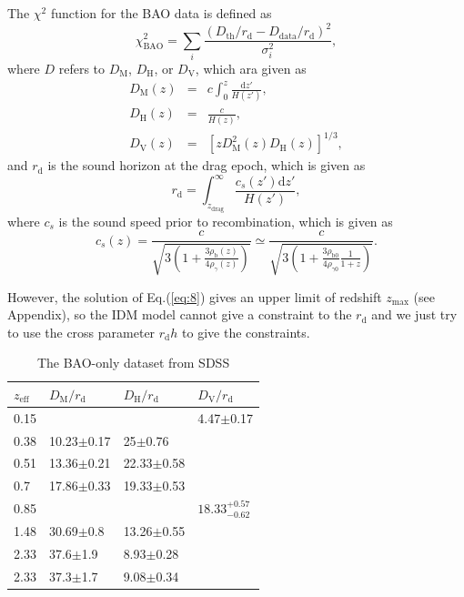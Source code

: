 \documentclass[twocolumn]{aastex631}
\begin{document}
   The $\chi^2$ function for the BAO data is defined as
   \begin{equation}
      \chi_{\text{BAO}}^2=\sum_i\frac{(D_{\text{th}}/r_{\text{d}}-D_{\text{data}}/r_{\text{d}})^2}{\sigma_i^2},
   \end{equation}
   where $D$ refers to $D_{\text{M}}$, $D_{\text{H}}$, or $D_{\text{V}}$, which ara given as
   \begin{eqnarray}
      D_{\text{M}}(z)&=&c\int_0^z\frac{\text{d}z'}{H(z')},\\
      D_{\text{H}}(z)&=&\frac{c}{H(z)},\\
      D_{\text{V}}(z)&=&\left[zD_{\text{M}}^2(z)D_{\text{H}}(z)\right]^{1/3},
   \end{eqnarray}
   and $r_{\text{d}}$ is the sound horizon at the drag epoch, which is given as
   \begin{equation}
      r_{\text{d}}=\int_{z_{\text{drag}}}^{\infty}\frac{c_s(z')\text{d}z'}{H(z')},
   \end{equation}
   where $c_s$ is the sound speed prior to recombination, which is given as
   \begin{equation}
      c_s(z)=\frac{c}{\sqrt{3\left(1+\frac{3\rho_{\mathrm{b}}(z)}{4\rho_{\gamma}(z)}\right)}}\simeq
      \frac{c}{\sqrt{3\left(1+\frac{3\rho_{\mathrm{b}0}}{4\rho_{\gamma0}}\frac{1}{1+z}\right)}}.
   \end{equation}

   However, the solution of Eq.(\ref{eq:8}) gives an upper limit of redshift $z_{\max}$
   (see Appendix), so the IDM model cannot give a constraint to the $r_{\text{d}}$ and we just try to use the cross
   parameter $r_{\text{d}}h$ to give the constraints.

   \begin{table}[htbp]
      \caption{The BAO-only dataset from SDSS}
      \centering
      \begin{tabular}{llll}
         \hline\hline
         $z_{\text{eff}}$ & $D_{\text{M}}/r_{\text{d}}$ & $D_{\text{H}}/r_{\text{d}}$ & $D_{\text{V}}/r_{\text{d}}$ \\
         \hline
         0.15 & & & 4.47$\pm$0.17 \\
         0.38 & 10.23$\pm$0.17 & 25$\pm$0.76 & \\
         0.51 & 13.36$\pm$0.21 & 22.33$\pm$0.58 & \\
         0.7 & 17.86$\pm$0.33 & 19.33$\pm$0.53 & \\
         0.85 & & & $18.33_{-0.62}^{+0.57}$ \\
         1.48 & 30.69$\pm$0.8 & 13.26$\pm$0.55 & \\
         2.33 & 37.6$\pm$1.9 & 8.93$\pm$0.28 & \\
         2.33 & 37.3$\pm$1.7 & 9.08$\pm$0.34 & \\
         \hline
      \end{tabular}
      \label{tab:2}
   \end{table}
\end{document}
